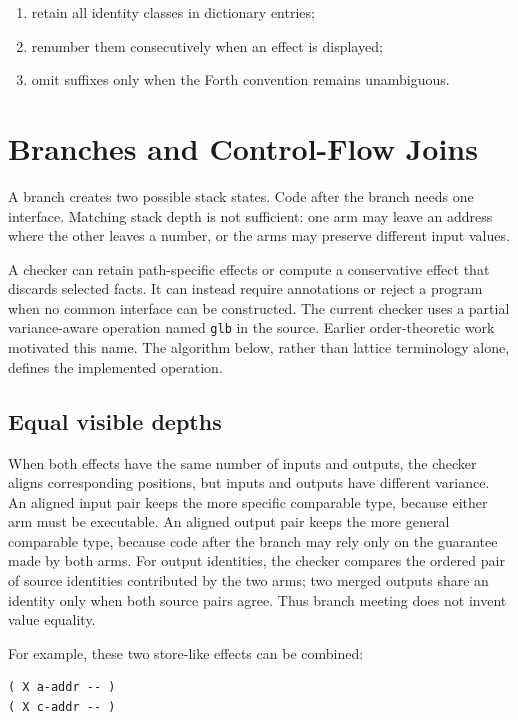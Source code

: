 \documentclass[11pt,a4paper]{article}
\begin{document}
\begin{enumerate}
  \item retain all identity classes in dictionary entries;
  \item renumber them consecutively when an effect is displayed;
  \item omit suffixes only when the Forth convention remains unambiguous.
\end{enumerate}

\section{Branches and Control-Flow Joins}
\label{sec:branches}

A branch creates two possible stack states.  Code after the branch needs one
interface.  Matching stack depth is not sufficient: one arm may leave an
address where the other leaves a number, or the arms may preserve different
input values.

A checker can retain path-specific effects or compute a conservative effect
that discards selected facts.  It can instead require annotations or reject a
program when no common interface can be constructed.  The current checker uses
a partial variance-aware operation named \texttt{glb} in the source.  Earlier
order-theoretic work motivated this name.  The algorithm below, rather than
lattice terminology alone, defines the implemented operation.

\subsection{Equal visible depths}

When both effects have the same number of inputs and outputs, the checker
aligns corresponding positions, but inputs and outputs have different
variance.  An aligned input pair keeps the more specific comparable type,
because either arm must be executable.  An aligned output pair keeps the more
general comparable type, because code after the branch may rely only on the
guarantee made by both arms.  For output identities, the checker compares the
ordered pair of source identities contributed by the two arms; two merged
outputs share an identity only when both source pairs agree.  Thus branch
meeting does not invent value equality.

For example, these two store-like effects can be combined:

\begin{lstlisting}
( X a-addr -- )
( X c-addr -- )
\end{lstlisting}
\end{document}
